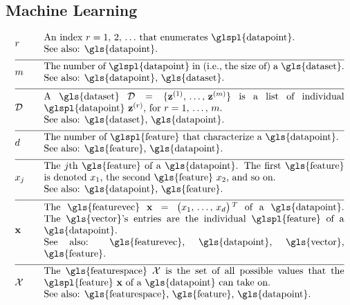 \newpage
\subsection*{Machine Learning}

\begin{align}
	&\sampleidx &\quad & \parbox{.90\textwidth}{An index $\sampleidx=1, \,2, \,\ldots$ that 
		enumerates \glspl{datapoint}.
		\\ See also: \gls{datapoint}. }   \nonumber \\[2mm] \hline \nonumber\\[-5mm]
	&\samplesize &\quad &\parbox{.90\textwidth}{The number of \glspl{datapoint} in (i.e., the size of) a \gls{dataset}.
		\\ See also: \gls{datapoint}, \gls{dataset}.} \nonumber \\[2mm] \hline \nonumber\\[-5mm] 
	&\dataset &\quad & \parbox{.90\textwidth}{A \gls{dataset} $\dataset = \{ \datapoint^{(1)}, \,\ldots, \,\datapoint^{(\samplesize)} \}$ 
		is a list of individual \glspl{datapoint} $\datapoint^{(\sampleidx)}$, for $\sampleidx=1, \,\ldots, \,\samplesize$.
		\\ See also: \gls{dataset}, \gls{datapoint}.}   \nonumber \\[2mm] \hline \nonumber\\[-5mm]
	&\featurelen &\quad &\parbox{.90\textwidth}{The number of \glspl{feature} that characterize a \gls{datapoint}.
		\\ See also: \gls{feature}, \gls{datapoint}.}\nonumber \\[2mm] \hline \nonumber\\[-5mm]
	&\feature_{\featureidx} &\quad &\parbox{.90\textwidth}{The $\featureidx$th \gls{feature} of a \gls{datapoint}. The first \gls{feature} 
		is denoted $\feature_{1}$, the second \gls{feature} $\feature_{2}$, and so on.
		\\ See also: \gls{datapoint}, \gls{feature}. } \nonumber \\[2mm] \hline \nonumber\\[-5mm] 
	&\featurevec &\quad &\parbox{.90\textwidth}{The \gls{featurevec} $\featurevec=\big(\feature_{1}, \,\ldots, \,\feature_{\featuredim}\big)\,^{T}$ of 
		a \gls{datapoint}. The \gls{vector}'s entries are the individual \glspl{feature} of a \gls{datapoint}.
		\\ See also: \gls{featurevec}, \gls{datapoint}, \gls{vector}, \gls{feature}. }\nonumber \\[2mm] \hline \nonumber\\[-5mm]
	&\featurespace &\quad & \parbox{.90\textwidth}{The \gls{featurespace} $\featurespace$ is 
		the set of all possible values that the \glspl{feature} $\featurevec$ of a \gls{datapoint} can take on.
		\\ See also: \gls{featurespace}, \gls{feature}, \gls{datapoint}.} \nonumber 
\end{align}        


